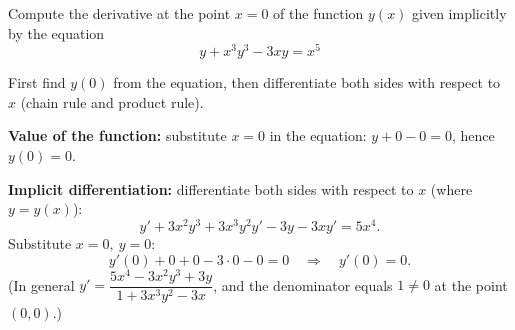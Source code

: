 
\begin{question}
Compute the derivative at the point $x=0$ of the function $y(x)$ given implicitly by the equation
\[ y+x^3y^3-3xy=x^5 \]
\end{question}

\begin{hint}
First find $y(0)$ from the equation, then differentiate both sides with respect to $x$ (chain rule and product rule).
\end{hint}

\begin{solution}
\textbf{Value of the function:} substitute $x=0$ in the equation: $y+0-0=0$, hence $y(0)=0$.

\textbf{Implicit differentiation:} differentiate both sides with respect to $x$ (where $y=y(x)$):
\[ y'+3x^2y^3+3x^3y^2y'-3y-3xy'=5x^4. \]
Substitute $x=0,\ y=0$:
\[ y'(0)+0+0-3\cdot 0-0=0 \quad\Longrightarrow\quad \boxed{y'(0)=0}. \]
(In general $y'=\dfrac{5x^4-3x^2y^3+3y}{1+3x^3y^2-3x}$, and the denominator equals $1\neq 0$ at the point $(0,0)$.)
\end{solution}
